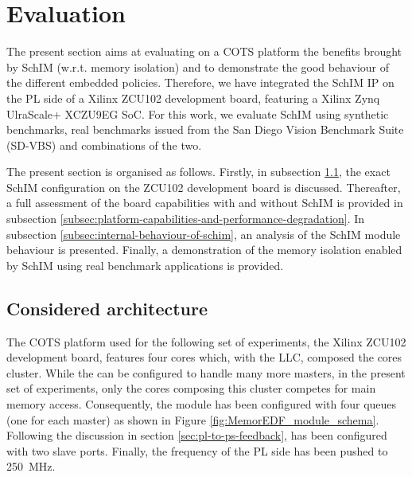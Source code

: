 \section{Evaluation}

  The present section aims at evaluating on a COTS platform the benefits brought by SchIM (w.r.t. memory isolation) and to demonstrate the good behaviour of the different embedded policies. Therefore, we have integrated the SchIM IP on the PL side of a Xilinx ZCU102 development board, featuring a Xilinx Zynq UlraScale+ XCZU9EG SoC. For this work, we evaluate SchIM using synthetic benchmarks, real benchmarks issued from the San Diego Vision Benchmark Suite (SD-VBS) \cite{SD-VBS} and combinations of the two.
  
  The present section is organised as follows. Firstly, in subsection \ref{subsection:considered-architecture}, the exact SchIM configuration on the ZCU102 development board is discussed. Thereafter, a full assessment of the board capabilities with and without SchIM is provided in subsection \ref{subsec:platform-capabilities-and-performance-degradation}. In subsection \ref{subsec:internal-behaviour-of-schim}, an analysis of the SchIM module behaviour is presented. Finally, a demonstration of the memory isolation enabled by SchIM using real benchmark applications is provided.

  \subsection{Considered architecture}
    \label{subsection:considered-architecture}
    The COTS platform used for the following set of experiments, the Xilinx ZCU102 development board, features four cores which, with the LLC, composed the cores cluster. While the \schim can be configured to handle many more masters, in the present set of experiments, only the cores composing this cluster competes for main memory access. Consequently, the \schim module has been configured with four queues (one for each master) as shown in Figure \ref{fig:MemorEDF_module_schema}. Following the discussion in section \ref{sec:pl-to-ps-feedback}, \schim has been configured with two slave ports. Finally, the frequency of the PL side has been pushed to 250~MHz.
    
